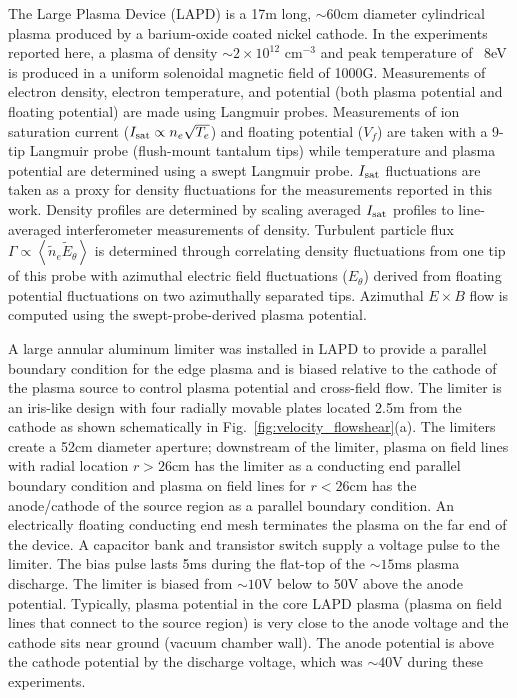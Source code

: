 \documentclass[aip,pop,amsmath,amssymb,reprint,superscriptaddress]{revtex4-1} %
\begin{document}
The Large Plasma Device \cite{gek91} (LAPD) is a 17m long, $\sim$60cm diameter cylindrical plasma produced by a barium-oxide coated nickel cathode. In the experiments reported here, a plasma of density $\sim$$2 \times 10^{12}$ cm$^{-3}$ and peak temperature of ~8eV is produced in a uniform solenoidal magnetic field of 1000G.  Measurements of electron density, electron temperature, and potential (both plasma potential and floating potential) are made using Langmuir probes.   Measurements of ion saturation current ($I_{\rm sat} \propto n_e \sqrt{T_e}$) and floating potential ($V_f$) are taken with a 9-tip Langmuir probe (flush-mount tantalum tips) while temperature and plasma potential are determined using a swept Langmuir probe. $I_{\rm sat}$ fluctuations are taken as a proxy for density fluctuations for the measurements reported in this work. Density profiles are determined by scaling averaged $I_{\rm sat}$ profiles to line-averaged interferometer measurements of density.  Turbulent particle flux $\Gamma \propto \left<\tilde{n}_e \tilde{E}_\theta\right>$ is determined through correlating density fluctuations from one tip of this probe with azimuthal electric field fluctuations ($E_\theta$) derived from floating potential fluctuations on two azimuthally separated tips. Azimuthal $E\times B$ flow is computed using the swept-probe-derived plasma potential. 

A large annular aluminum limiter was installed in LAPD to provide a parallel boundary condition for the edge plasma and is biased relative to the cathode of the plasma source to control plasma potential and cross-field flow.  The limiter is an iris-like design with four radially movable plates located 2.5m from the cathode as shown schematically in Fig.~\ref{fig:velocity_flowshear}(a).  The limiters create a 52cm diameter aperture; downstream of the limiter, plasma on field lines with radial location $r>26$cm has the limiter as a conducting end parallel boundary condition and plasma on field lines for $r<26$cm has the anode/cathode of the source region as a parallel boundary condition.  An electrically floating conducting end mesh terminates the plasma on the far end of the device.  A capacitor bank and transistor switch supply a voltage pulse to the limiter.  The bias pulse lasts 5ms during the flat-top of the $\sim$$15$ms plasma  discharge. The limiter is biased from $\sim$$10$V below to 50V above the anode potential.  Typically, plasma potential in the core LAPD plasma (plasma on field lines that connect to the source region) is very close to the anode voltage and the cathode sits near ground (vacuum chamber wall).  The anode potential is above the cathode potential by the discharge voltage, which was $\sim$$40$V during these experiments.
\end{document}
